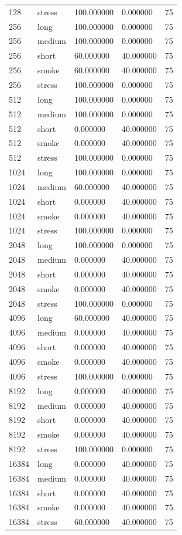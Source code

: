 \begin{tabular}{lllll}
128 & stress & 100.000000 & 0.000000 & 75 \\
256 & long & 100.000000 & 0.000000 & 75 \\
256 & medium & 100.000000 & 0.000000 & 75 \\
256 & short & 60.000000 & 40.000000 & 75 \\
256 & smoke & 60.000000 & 40.000000 & 75 \\
256 & stress & 100.000000 & 0.000000 & 75 \\
512 & long & 100.000000 & 0.000000 & 75 \\
512 & medium & 100.000000 & 0.000000 & 75 \\
512 & short & 0.000000 & 40.000000 & 75 \\
512 & smoke & 0.000000 & 40.000000 & 75 \\
512 & stress & 100.000000 & 0.000000 & 75 \\
1024 & long & 100.000000 & 0.000000 & 75 \\
1024 & medium & 60.000000 & 40.000000 & 75 \\
1024 & short & 0.000000 & 40.000000 & 75 \\
1024 & smoke & 0.000000 & 40.000000 & 75 \\
1024 & stress & 100.000000 & 0.000000 & 75 \\
2048 & long & 100.000000 & 0.000000 & 75 \\
2048 & medium & 0.000000 & 40.000000 & 75 \\
2048 & short & 0.000000 & 40.000000 & 75 \\
2048 & smoke & 0.000000 & 40.000000 & 75 \\
2048 & stress & 100.000000 & 0.000000 & 75 \\
4096 & long & 60.000000 & 40.000000 & 75 \\
4096 & medium & 0.000000 & 40.000000 & 75 \\
4096 & short & 0.000000 & 40.000000 & 75 \\
4096 & smoke & 0.000000 & 40.000000 & 75 \\
4096 & stress & 100.000000 & 0.000000 & 75 \\
8192 & long & 0.000000 & 40.000000 & 75 \\
8192 & medium & 0.000000 & 40.000000 & 75 \\
8192 & short & 0.000000 & 40.000000 & 75 \\
8192 & smoke & 0.000000 & 40.000000 & 75 \\
8192 & stress & 100.000000 & 0.000000 & 75 \\
16384 & long & 0.000000 & 40.000000 & 75 \\
16384 & medium & 0.000000 & 40.000000 & 75 \\
16384 & short & 0.000000 & 40.000000 & 75 \\
16384 & smoke & 0.000000 & 40.000000 & 75 \\
16384 & stress & 60.000000 & 40.000000 & 75 \\
 \hline
\end{tabular}
